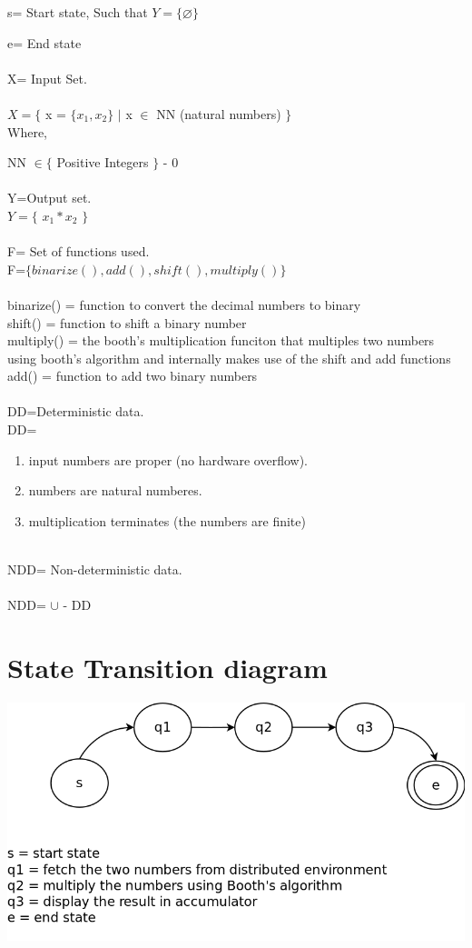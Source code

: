 \documentclass[10pt,a4paper]{article}
\begin{document}
s= Start state,  Such that $Y=\lbrace \varnothing \rbrace$ 

e= End state  \\\\
X= Input Set. \\\\
$X=\lbrace$ x = $\lbrace x_1, x_2 \rbrace$ $\mid$ x $\in$ NN (natural numbers) $\rbrace$ \\
Where,

NN $\in \lbrace$ Positive Integers $\rbrace$ - 0\\\\ 
Y=Output set.\\
$Y=\lbrace$ $x_1 * x_2$ $\rbrace $ \\\\
F= Set of functions used.\\
F=$\lbrace binarize(), add(), shift(), multiply() \rbrace$ \\\\
binarize() = function to convert the decimal numbers to binary\\
shift() = function to shift a binary number\\
multiply() = the booth's multiplication funciton that multiples two numbers using booth's algorithm and internally makes use of the shift and add functions\\
add() = function to add two binary numbers\\\\
DD=Deterministic data. \\
DD=
\begin{enumerate}
\item input numbers are proper (no hardware overflow).
\item numbers are natural numberes.
\item multiplication terminates (the numbers are finite)\\\\
\end{enumerate}
NDD= Non-deterministic data. \\
\\NDD= $\cup$ - DD\\


\section{State Transition diagram}
\includegraphics[scale=0.28]{stdg.png}
\end{document}
